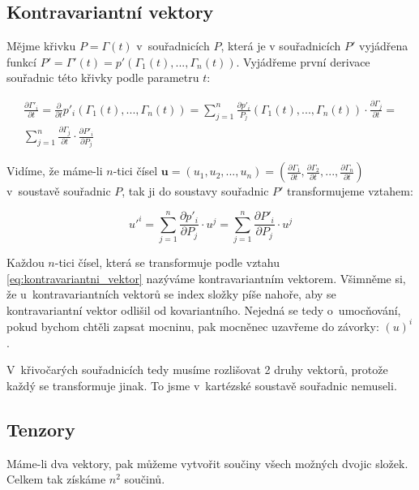 \documentclass{book}
\newcommand{\vect}[1]{\boldsymbol{#1}}
\begin{document}
\subsection{Kontravariantní vektory}

Mějme křivku \(P = \Gamma(t)\) v~souřadnicích \(P\), která je v souřadnicích \(P'\) vyjádřena funkcí \(P' = \Gamma'(t) = p'(\Gamma_1(t), ..., \Gamma_n(t))\). Vyjádřeme první derivace souřadnic této křivky podle parametru \(t\):

\begin{equation}
\begin{split}
\frac{\partial \Gamma'_i}{\partial t} = \frac{\partial}{\partial t} p'_i(\Gamma_1(t), ..., \Gamma_n(t)) = \sum_{j=1}^n \frac{\partial p'_i}{P_j} (\Gamma_1(t), ..., \Gamma_n(t)) \cdot \frac{\partial \Gamma_j}{\partial t} = \\
\sum_{j=1}^n \frac{\partial \Gamma_j}{\partial t} \cdot \frac{\partial P'_i}{\partial P_j}
\end{split}
\end{equation}

Vidíme, že máme-li \(n\)-tici čísel \(\vect{u} = (u_1, u_2, ..., u_n) = \left( \frac{\partial \Gamma_1}{\partial t}, \frac{\partial \Gamma_2}{\partial t}, ..., \frac{\partial \Gamma_n}{\partial t} \right)\) v~soustavě souřadnic \(P\), tak ji do soustavy souřadnic \(P'\) transformujeme vztahem:

\begin{equation}
\label{eq:kontravariantni_vektor}
u'^i = \sum_{j=1}^n \frac{\partial p'_i}{\partial P_j} \cdot u^j = \sum_{j=1}^n \frac{\partial P'_i}{\partial P_j} \cdot u^j
\end{equation}

Každou \(n\)-tici čísel, která se transformuje podle vztahu \eqref{eq:kontravariantni_vektor} nazýváme kontravariantním vektorem. Všimněme si, že u~kontravariantních vektorů se index složky píše nahoře, aby se kontravariantní vektor odlišil od kovariantního. Nejedná se tedy o~umocňování, pokud bychom chtěli zapsat mocninu, pak mocněnec uzavřeme do závorky: \((u)^i\).

V~křivočarých souřadnicích tedy musíme rozlišovat 2 druhy vektorů, protože každý se transformuje jinak. To jsme v~kartézské soustavě souřadnic nemuseli.

\subsection{Tenzory}

Máme-li dva vektory, pak můžeme vytvořit součiny všech možných dvojic složek. Celkem tak získáme \(n^2\) součinů.
\end{document}
